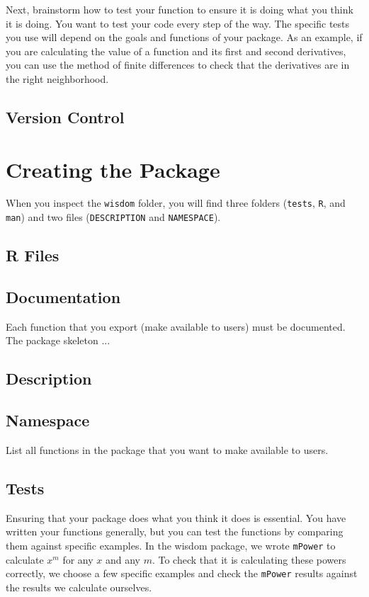 \documentclass{article}
\begin{document}
Next, brainstorm how to test your function to ensure it is doing what you think it is doing. You want to test your code every step of the way. The specific tests you use will depend on the goals and functions of your package. As an example, if you are calculating the value of a function and its first and second derivatives, you can use the method of finite differences to check that the derivatives are in the right neighborhood. 


\subsection{Version Control}

\section{Creating the Package}
When you inspect the \texttt{wisdom} folder, you will find three folders (\texttt{tests}, \texttt{R}, and \texttt{man}) and two files (\texttt{DESCRIPTION} and \texttt{NAMESPACE}). 

\subsection{R Files} 

\subsection{Documentation}
Each function that you export (make available to users) must be documented. The package skeleton ...
\subsection{Description}
\subsection{Namespace} List all functions in the package that you want to make available to users.
\subsection{Tests} Ensuring that your package does what you think it does is essential. You have written your functions generally, but you can test the functions by comparing them against specific examples. In the wisdom package, we wrote \texttt{mPower} to calculate $x^m$ for any $x$ and any $m$. To check that it is calculating these powers correctly, we choose a few specific examples and check the \texttt{mPower} results against the results we calculate ourselves.\\
\end{document}
